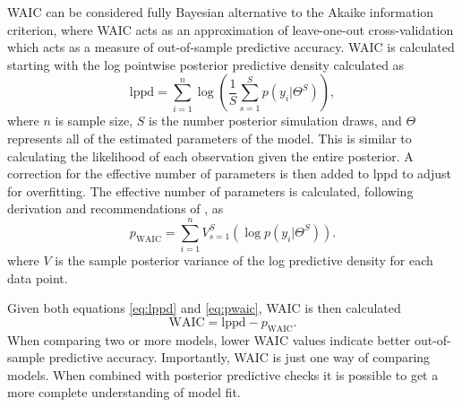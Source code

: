 \documentclass[12pt,letterpaper]{article}
\begin{document}
WAIC can be considered fully Bayesian alternative to the Akaike information criterion, where WAIC acts as an approximation of leave-one-out cross-validation which acts as a measure of out-of-sample predictive accuracy. WAIC is calculated starting with the log pointwise posterior predictive density calculated as
\begin{equation}
  \mathrm{lppd} = \sum_{i = 1}^{n} \log \left(\frac{1}{S} \sum_{s = 1}^{S} p(y_{i}|\Theta^{S})\right),
  \label{eq:lppd}
\end{equation}
where \(n\) is sample size, \(S\) is the number posterior simulation draws, and \(\Theta\) represents all of the estimated parameters of the model. This is similar to calculating the likelihood of each observation given the entire posterior. A correction for the effective number of parameters is then added to lppd to adjust for overfitting. The effective number of parameters is calculated, following derivation and recommendations of \citep{Gelman2013d}, as
\begin{equation}
  p_{\mathrm{WAIC}} = \sum_{i = 1}^{n} V_{s = 1}^{S} (\log p(y_{i}|\Theta^{S})).
  \label{eq:pwaic}
\end{equation}
where \(V\) is the sample posterior variance of the log predictive density for each data point.

Given both equations \ref{eq:lppd} and \ref{eq:pwaic}, WAIC is then calculated
\begin{equation}
  \mathrm{WAIC} = \mathrm{lppd} - p_{\mathrm{WAIC}}.
  \label{eq:waic}
\end{equation}
When comparing two or more models, lower WAIC values indicate better out-of-sample predictive accuracy. Importantly, WAIC is just one way of comparing models. When combined with posterior predictive checks it is possible to get a more complete understanding of model fit.
\end{document}
